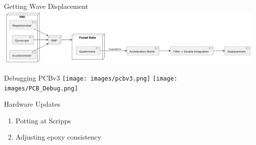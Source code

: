 

\begin{frame}{Getting Wave Displacement}
    \centering
    \includegraphics[height=1\textheight,width=1\textwidth,keepaspectratio]{images/wavedisp2.png}
\end{frame}

\begin{frame}{Debugging PCBv3}
    \centering
    \texttt{[image: images/pcbv3.png]}
    \texttt{[image: images/PCB\_Debug.png]}
\end{frame}









\begin{frame}{Hardware Updates}
      \begin{enumerate}
          \item Potting at Scripps
           \item Adjusting epoxy consistency
    \end{enumerate}
\end{frame}

